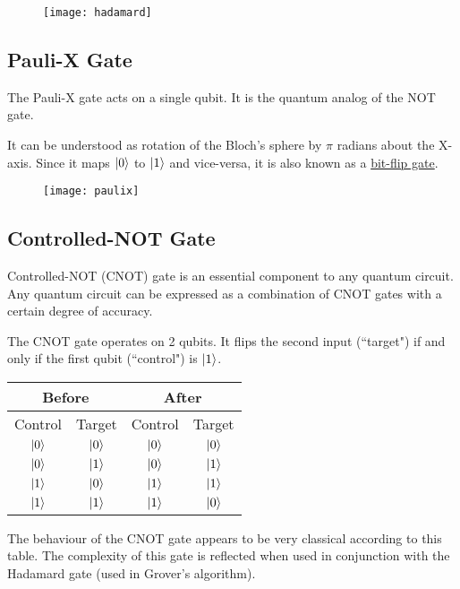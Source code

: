 \documentclass[a4paper]{article}
\begin{document}
\begin{figure}[h]
\texttt{[image: hadamard]}
\centering
\end{figure}

\subsection{ Pauli-X Gate }
The Pauli-X gate acts on a single qubit. It is the quantum analog of the NOT gate. 
\\
\par
It can be understood as rotation of the Bloch's sphere by $\pi$ radians about the X-axis.
Since it maps $\ket{0}$ to $\ket{1}$ and vice-versa, it is also known as a
\underline{bit-flip gate}.


\begin{figure}[h]
\texttt{[image: paulix]}
\centering
\end{figure}

\subsection{ Controlled-NOT Gate }
Controlled-NOT (CNOT) gate is an essential component to any quantum circuit. Any quantum
circuit can be expressed as a combination of CNOT gates with a certain degree of 
accuracy.
\\
\par
\pagebreak
The CNOT gate operates on 2 qubits. It flips the second input (``target") if and only 
if the first qubit (``control") is $\ket{1}$.

\begin{table}[h!]
    \centering
    \begin{tabular}{ |c|c|c|c|  }
        \hline
        \multicolumn{2}{|c}{Before} & \multicolumn{2}{|c|}{After} \\
        \hline
        Control & Target & Control & Target\\
        \hline
        $\ket{0}$ & $\ket{0}$ & $\ket{0}$ & $\ket{0}$ \\
        $\ket{0}$ & $\ket{1}$ & $\ket{0}$ & $\ket{1}$ \\
        $\ket{1}$ & $\ket{0}$ & $\ket{1}$ & $\ket{1}$ \\
        $\ket{1}$ & $\ket{1}$ & $\ket{1}$ & $\ket{0}$ \\
        \hline
    \end{tabular}
\end{table}
The behaviour of the CNOT gate appears to be very classical according to this table. 
The complexity of this gate is reflected when used in conjunction with the Hadamard
gate (used in Grover's algorithm).
\end{document}

